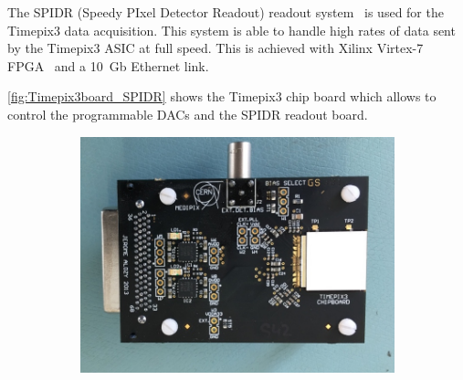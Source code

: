The SPIDR (Speedy PIxel Detector Readout) readout
system~\cite{Visser:2015bsa} is used for the Timepix3 data
acquisition. This system is able to handle high rates of data sent by
the Timepix3 ASIC at full speed. This is achieved with Xilinx Virtex-7
FPGA~\cite{XilinxVirtex7} and a 10~Gb Ethernet link.

\cref{fig:Timepix3board_SPIDR} shows the Timepix3 chip board which
allows to control the programmable DACs and the SPIDR readout board.

\begin{figure}[htbp] \centering
  \begin{subfigure}[b]{0.3\textwidth}
    \includegraphics[width=\textwidth]{./figures/Calibration/Timepix3board2.jpg}
    \caption{}\label{fig:Timepix3board_PCB}
  \end{subfigure}\hfill
  \begin{subfigure}[b]{0.65\textwidth}

\end{subfigure}
\end{figure}
